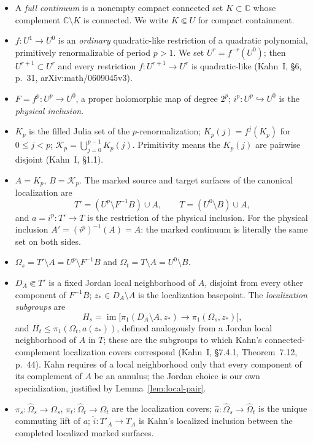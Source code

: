 \begin{itemize}
\item A \emph{full continuum} is a nonempty compact connected set \(K\subset\mathbb C\) whose complement \(\mathbb C\setminus K\) is connected.  We write \(K\Subset U\) for compact containment.
\item \(f\colon U^1\to U^0\) is an \emph{ordinary} quadratic-like restriction of a quadratic polynomial, primitively renormalizable of period \(p>1\).  We set \(U^r=f^{-r}(U^0)\); then \(U^{r+1}\subset U^r\) and every restriction \(f\colon U^{r+1}\to U^r\) is quadratic-like (Kahn~I, \S6, p.~31, arXiv:math/0609045v3).
\item \(F=f^p\colon U^p\to U^0\), a proper holomorphic map of degree \(2^p\); \(i^p\colon U^p\hookrightarrow U^0\) is the \emph{physical inclusion}.
\item \(K_p\) is the filled Julia set of the \(p\)-renormalization; \(K_p(j)=f^j(K_p)\) for \(0\le j<p\); \(\mathcal K_p=\bigcup_{j=0}^{p-1}K_p(j)\).  Primitivity means the \(K_p(j)\) are pairwise disjoint (Kahn~I, \S1.1).
\item \(A=K_p\), \(B=\mathcal K_p\).  The marked source and target surfaces of the canonical localization are
\[
 T'=(U^p\setminus F^{-1}B)\cup A,
 \qquad
 T=(U^0\setminus B)\cup A,                     \tag{1.1}
\]
and \(a=i^p\colon T'\to T\) is the restriction of the physical inclusion.  For the physical inclusion \(A'=(i^p)^{-1}(A)=A\): the marked continuum is literally the same set on both sides.
\item \(\Omega_s=T'\setminus A=U^p\setminus F^{-1}B\) and \(\Omega_t=T\setminus A=U^0\setminus B\).
\item \(D_A\Subset T'\) is a fixed Jordan local neighborhood of \(A\), disjoint from every other component of \(F^{-1}B\); \(z_*\in D_A\setminus A\) is the localization basepoint.  The \emph{localization subgroups} are
\[
 H_s=\operatorname{im}\bigl[\pi_1(D_A\setminus A,z_*)\longrightarrow\pi_1(\Omega_s,z_*)\bigr],  \tag{5.2}
\]
and \(H_t\le\pi_1(\Omega_t,a(z_*))\), defined analogously from a Jordan local neighborhood of \(A\) in \(T\); these are the subgroups to which Kahn's connected-complement localization covers correspond (Kahn~I, \S7.4.1, Theorem~7.12, p.~44).  Kahn requires of a local neighborhood only that every component of its complement of \(A\) be an annulus; the Jordan choice is our own specialization, justified by Lemma~\ref{lem:local-pair}.
\item \(\pi_s\colon\widehat\Omega_s\to\Omega_s\), \(\pi_t\colon\widehat\Omega_t\to\Omega_t\) are the localization covers; \(\widehat a\colon\widehat\Omega_s\to\widehat\Omega_t\) is the unique commuting lift of \(a\); \(\widehat i\colon T'_A\to T_A\) is Kahn's localized inclusion between the completed localized marked surfaces.

\end{itemize}
